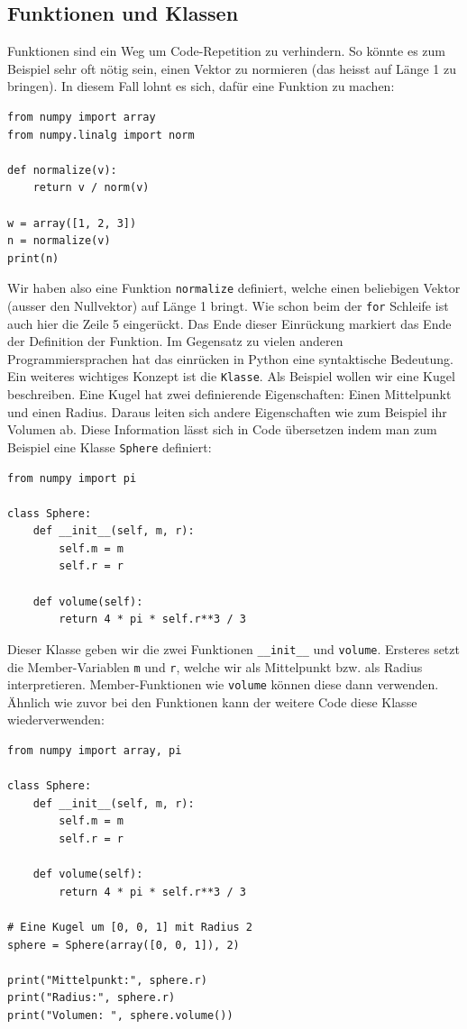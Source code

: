 \documentclass[12pt,a4paper]{article}
\theoremstyle{definition}
\theoremstyle{definition}
\begin{document}
\subsection{Funktionen und Klassen}
Funktionen sind ein Weg um Code-Repetition zu verhindern.
So könnte es zum Beispiel sehr oft nötig sein, einen Vektor zu normieren (das heisst auf Länge 1 zu bringen).
In diesem Fall lohnt es sich, dafür eine Funktion zu machen:
\begin{lstlisting}[style=python]
from numpy import array
from numpy.linalg import norm

def normalize(v):
	return v / norm(v)

w = array([1, 2, 3])
n = normalize(v)
print(n)
\end{lstlisting}
Wir haben also eine Funktion \texttt{normalize} definiert, welche einen beliebigen Vektor (ausser den Nullvektor) auf Länge 1 bringt.
Wie schon beim der \texttt{for} Schleife ist auch hier die Zeile 5 eingerückt.
Das Ende dieser Einrückung markiert das Ende der Definition der Funktion.
Im Gegensatz zu vielen anderen Programmiersprachen hat das einrücken in Python eine syntaktische Bedeutung.
Ein weiteres wichtiges Konzept ist die \texttt{Klasse}.
Als Beispiel wollen wir eine Kugel beschreiben.
Eine Kugel hat zwei definierende Eigenschaften: Einen Mittelpunkt und einen Radius.
Daraus leiten sich andere Eigenschaften wie zum Beispiel ihr Volumen ab.
Diese Information lässt sich in Code übersetzen indem man zum Beispiel eine Klasse \texttt{Sphere} definiert:
\begin{lstlisting}[style=python]
from numpy import pi

class Sphere:
	def __init__(self, m, r):
		self.m = m
		self.r = r

	def volume(self):
		return 4 * pi * self.r**3 / 3
\end{lstlisting}
Dieser Klasse geben wir die zwei Funktionen \texttt{\_\_init\_\_} und \texttt{volume}.
Ersteres setzt die Member-Variablen \texttt{m} und \texttt{r}, welche wir als Mittelpunkt bzw. als Radius interpretieren.
Member-Funktionen wie \texttt{volume} können diese dann verwenden.
Ähnlich wie zuvor bei den Funktionen kann der weitere Code diese Klasse wiederverwenden:
\begin{lstlisting}[style=python]
from numpy import array, pi

class Sphere:
	def __init__(self, m, r):
		self.m = m
		self.r = r

	def volume(self):
		return 4 * pi * self.r**3 / 3

# Eine Kugel um [0, 0, 1] mit Radius 2
sphere = Sphere(array([0, 0, 1]), 2)

print("Mittelpunkt:", sphere.r)
print("Radius:", sphere.r)
print("Volumen: ", sphere.volume())
\end{lstlisting}
\end{document}
